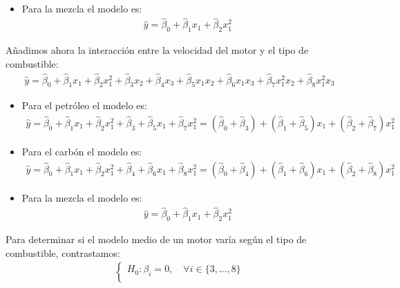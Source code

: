 \begin{ejemplo}
\begin{itemize}
\begin{align*}
              \end{align*}
        \item Para la mezcla el modelo es:
              \begin{align*}
                  \widehat{y} = \widehat{\beta}_0 + \widehat{\beta}_1x_1 + \widehat{\beta}_2x_1^2
              \end{align*}
    \end{itemize}
    Añadimos ahora la interacción entre la velocidad del motor y el tipo de combustible:
    \begin{align*}
        \widehat{y} = \widehat{\beta}_0 + \widehat{\beta}_1x_1 + \widehat{\beta}_2x_1^2 + \widehat{\beta}_3x_2 + \widehat{\beta}_4x_3 + \widehat{\beta}_5x_1x_2 + \widehat{\beta}_6x_1x_3 + \widehat{\beta}_7x_1^2x_2 + \widehat{\beta}_8x_1^2x_3
    \end{align*}
    \begin{itemize}
        \item Para el petróleo el modelo es:
              \begin{align*}
                  \widehat{y} = \widehat{\beta}_0 + \widehat{\beta}_1x_1 + \widehat{\beta}_2x_1^2 + \widehat{\beta}_3 + \widehat{\beta}_5x_1 + \widehat{\beta}_7x_1^2 = (\widehat{\beta}_0 + \widehat{\beta}_3) + (\widehat{\beta}_1 + \widehat{\beta}_5)x_1 + (\widehat{\beta}_2 + \widehat{\beta}_7)x_1^2
              \end{align*}
        \item Para el carbón el modelo es:
              \begin{align*}
                  \widehat{y} = \widehat{\beta}_0 + \widehat{\beta}_1x_1 + \widehat{\beta}_2x_1^2 + \widehat{\beta}_4 + \widehat{\beta}_6x_1 + \widehat{\beta}_8x_1^2 = (\widehat{\beta}_0 + \widehat{\beta}_4) + (\widehat{\beta}_1 + \widehat{\beta}_6)x_1 + (\widehat{\beta}_2 + \widehat{\beta}_8)x_1^2
              \end{align*}
        \item Para la mezcla el modelo es:
              \begin{align*}
                  \widehat{y} = \widehat{\beta}_0 + \widehat{\beta}_1x_1 + \widehat{\beta}_2x_1^2
              \end{align*}
    \end{itemize}
    Para determinar si el modelo medio de un motor varía según el tipo de combustible, contrastamos:
    \begin{align*}
        \begin{cases}
            H_0: \beta_i = 0, \quad \forall i \in \{3,\ldots,8\} \\

\end{cases}
\end{align*}
\end{ejemplo}
